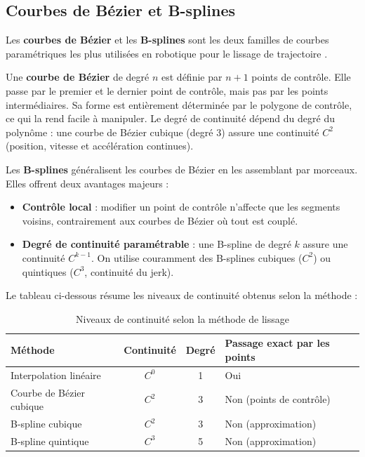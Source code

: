\subsection{Courbes de Bézier et B-splines}

Les \textbf{courbes de Bézier} et les \textbf{B-splines} sont les deux familles de courbes paramétriques les plus utilisées en robotique pour le lissage de trajectoire \cite{gasparetto2015}.

Une \textbf{courbe de Bézier} de degré $n$ est définie par $n+1$ points de contrôle. Elle passe par le premier et le dernier point de contrôle, mais pas par les points intermédiaires. Sa forme est entièrement déterminée par le polygone de contrôle, ce qui la rend facile à manipuler. Le degré de continuité dépend du degré du polynôme : une courbe de Bézier cubique (degré 3) assure une continuité $C^2$ (position, vitesse et accélération continues).

Les \textbf{B-splines} généralisent les courbes de Bézier en les assemblant par morceaux. Elles offrent deux avantages majeurs :
\begin{itemize}
\item \textbf{Contrôle local} : modifier un point de contrôle n'affecte que les segments voisins, contrairement aux courbes de Bézier où tout est couplé.
\item \textbf{Degré de continuité paramétrable} : une B-spline de degré $k$ assure une continuité $C^{k-1}$. On utilise couramment des B-splines cubiques ($C^2$) ou quintiques ($C^3$, continuité du jerk).
\end{itemize}

Le tableau ci-dessous résume les niveaux de continuité obtenus selon la méthode :

\begin{table}[H]
\centering
\caption{Niveaux de continuité selon la méthode de lissage}
\label{tab:continuite}
\begin{tabular}{|l|c|c|l|}
\hline
\textbf{Méthode} & \textbf{Continuité} & \textbf{Degré} & \textbf{Passage exact par les points} \\
\hline
Interpolation linéaire & $C^0$ & 1 & Oui \\
\hline
Courbe de Bézier cubique & $C^2$ & 3 & Non (points de contrôle) \\
\hline
B-spline cubique & $C^2$ & 3 & Non (approximation) \\
\hline
B-spline quintique & $C^3$ & 5 & Non (approximation) \\
\hline
\end{tabular}
\end{table}

